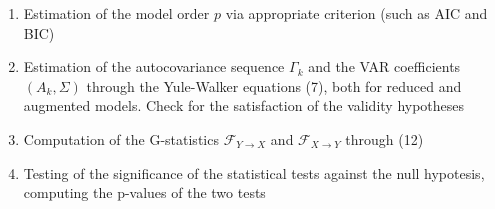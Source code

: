 \documentclass[a4paper]{article}
\begin{document}
\begin{enumerate}
	\item Estimation of the model order $p$ via appropriate criterion (such as AIC and BIC)
	
	\item Estimation of the autocovariance sequence $\Gamma_k$ and the VAR coefficients $(A_k, \Sigma)$ through the Yule-Walker equations (7), both for reduced and augmented models. Check for the satisfaction of the validity hypotheses
	
	\item Computation of the G-statistics $ \mathcal{F}_{Y \rightarrow X} $ and $ \mathcal{F}_{X \rightarrow Y} $ through (12)
	
	\item Testing of the significance of the statistical tests against the null hypotesis, computing the p-values of the two tests 
	
\end{enumerate}
\end{document}
